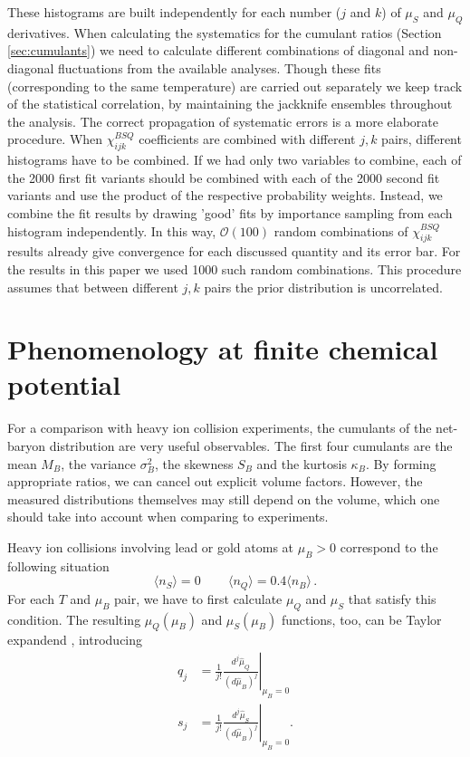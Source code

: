 \documentclass[a4paper,11pt]{article}
\begin{document}
These histograms are built independently for each number ($j$ and $k$) of $\mu_S$ and $\mu_Q$ derivatives.
When calculating the systematics for the cumulant ratios (Section \ref{sec:cumulants}) we
need to calculate different combinations of diagonal and non-diagonal fluctuations
from the available analyses. Though these fits (corresponding to the same temperature) are carried out
separately we keep track of the statistical correlation, by maintaining the jackknife ensembles
throughout the analysis. The correct propagation of systematic errors is a more elaborate
procedure. When $\chi^{BSQ}_{ijk}$ coefficients are combined with different $j,k$ pairs,
different histograms have to be combined. If we had only two variables to combine,
each of the 2000 first fit variants should be combined with each of the 2000
second fit variants and use the product of the respective probability weights.
Instead, we combine the fit results by drawing 'good' fits by importance
sampling from each histogram independently. In this way, $\mathcal{O}(100)$
random combinations of $\chi^{BSQ}_{ijk}$ results already give convergence for
each discussed quantity and its error bar. For the results in this paper
we used 1000 such random combinations.  This procedure assumes that between
different ${j,k}$ pairs the prior distribution is uncorrelated.


\section{Phenomenology at finite chemical potential\label{sec:cumulants}}

For a comparison with heavy ion collision experiments, the cumulants of the
net-baryon distribution are very useful observables. The first four cumulants
are the mean $M_B$, the variance $\sigma_B^2$, the skewness $S_B$ and the
kurtosis $\kappa_B$. By forming appropriate ratios, we can cancel out explicit
volume factors. However, the measured distributions themselves may still depend
on the volume, which one should take into account when comparing to
experiments. 

Heavy ion collisions involving lead or gold atoms at $\mu_B > 0$ correspond to the following situation
\begin{equation}
\langle n_S \rangle = 0 \, \qquad \langle n_Q\rangle = 0.4 \langle n_B\rangle\,.
\label{eq:neutrality}
\end{equation}
For each $T$ and $\mu_B$ pair, we have to first calculate $\mu_Q$ and $\mu_S$ that satisfy
this condition. The resulting $\mu_Q(\mu_B)$ and $\mu_S(\mu_B)$ functions, too,
can be Taylor expandend \cite{Bazavov:2012vg,Borsanyi:2013hza}, introducing
\begin{align}
q_j&=\left.\frac{1}{j!} \frac{d^j\hat\mu_Q}{(d\hat\mu_B)^j}\right|_{\mu_B=0}\\
s_j&=\left.\frac{1}{j!} \frac{d^j\hat\mu_S}{(d\hat\mu_B)^j}\right|_{\mu_B=0}.
\end{align}
\end{document}
